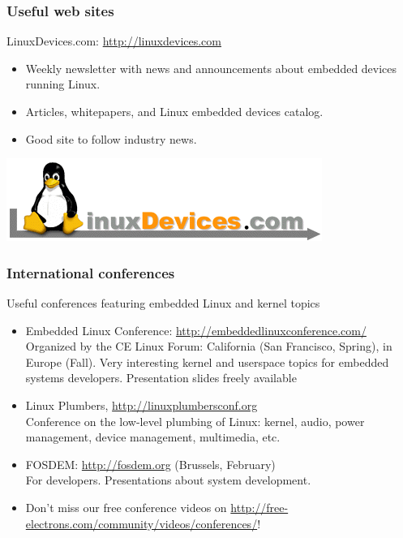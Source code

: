 \begin{frame}
  \frametitle{Useful web sites}
  LinuxDevices.com: \url{http://linuxdevices.com}
  \begin{itemize}
  \item Weekly newsletter with news and announcements about embedded
    devices running Linux.
  \item Articles, whitepapers, and Linux embedded devices catalog.
  \item Good site to follow industry news.
  \end{itemize}
  \begin{center}
    \includegraphics[width=\textwidth]{slides/sysdev-embedded-linux/linuxdevices.png}\\
  \end{center}
\end{frame}

\begin{frame}
  \frametitle{International conferences}
  Useful conferences featuring embedded Linux and kernel topics
  \begin{itemize}
  \item Embedded Linux Conference: \url{http://embeddedlinuxconference.com/}\\
    Organized by the CE Linux Forum: California (San Francisco,
    Spring), in Europe (Fall).  Very interesting kernel and userspace
    topics for embedded systems developers.  Presentation slides
    freely available
  \item Linux Plumbers, \url{http://linuxplumbersconf.org}\\
    Conference on the low-level plumbing of Linux: kernel, audio,
    power management, device management, multimedia, etc.
  \item FOSDEM: \url{http://fosdem.org} (Brussels, February)\\
    For developers. Presentations about system development.
  \item Don't miss our free conference videos on
    \url{http://free-electrons.com/community/videos/conferences/}!
  \end{itemize}
\end{frame}
